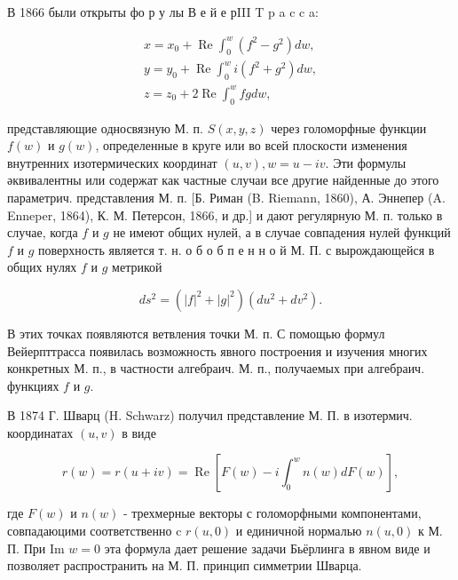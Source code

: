 \documentclass[10pt]{article}
\begin{document}
В 1866 были открыты фо р у лы В е й е рIII T p a c c a:



\[

\begin{gathered}

x=x_{0}+\operatorname{Re} \int_{0}^{w}\left(f^{2}-g^{2}\right) d w, \\

y=y_{0}+\operatorname{Re} \int_{0}^{w} i\left(f^{2}+g^{2}\right) d w, \\

z=z_{0}+2 \operatorname{Re} \int_{0}^{w} f g d w,

\end{gathered}

\]



представляющие односвязную М. п. $S(x, y, z)$ через голоморфные функции $f(w)$ и $g(w)$, определенные в круге или во всей плоскости изменения внутренних изотермических координат $(u, v), w=u-i v$. Эти формулы әквивалентны или содержат как частные случаи все другие найденные до этого параметрич. представления М. п. [Б. Риман (B. Riemann, 1860), А. Эннепер (A. Enneper, 1864), К. М. Петерсон, 1866, и др.] и дают регулярную М. п. только в случае, когда $f$ и $g$ не имеют общих нулей, а в случае совпадения нулей функций $f$ и $g$ поверхность является т. н. о б о б п е н н о й М. П. с вырождающейся в общих нулях $f$ и $g$ метрикой



\[

d s^{2}=\left(|f|^{2}+|g|^{2}\right)\left(d u^{2}+d v^{2}\right) .

\]



В этих точках появляются ветвления точки М. п. С помощью формул Вейерпттрасса появилась возможность явного построения и изучения многих конкретных М. п., в частности алгебраич. М. п., получаемых при алгебраич. функциях $f$ и $g$.



В 1874 Г. Шварц (H. Schwarz) получил представление М. П. в изотермич. координатах $(u, v)$ в виде



\[

r(w)=r(u+i v)=\operatorname{Re}\left[F(w)-i \int_{0}^{w} n(w) d F(w)\right],

\]



где $F(w)$ и $n(w)$ - трехмерные векторы с голоморфными компонентами, совпадаюцими соответственно c $r(u, 0)$ и единичной нормалью $n(u, 0)$ к М. П. При Im $w=0$ эта формула дает решение задачи Бьёрлинга в явном виде и позволяет распространить на М. П. принцип симметрии Шварца.
\end{document}
